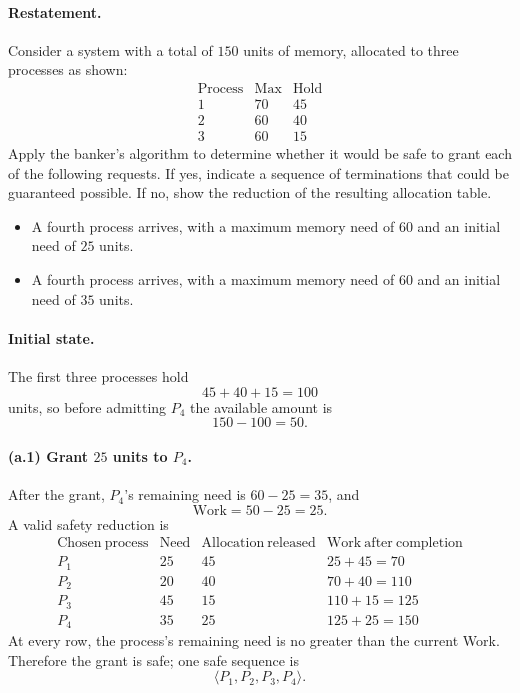 \paragraph{Restatement.}
Consider a system with a total of \(150\) units of memory, allocated to
three processes as shown:
\[
\begin{array}{c|c|c}
\mathrm{Process}&\mathrm{Max}&\mathrm{Hold}\\ \hline
1&70&45\\
2&60&40\\
3&60&15
\end{array}
\]
Apply the banker's algorithm to determine whether it would be safe to
grant each of the following requests.  If yes, indicate a sequence of
terminations that could be guaranteed possible.  If no, show the
reduction of the resulting allocation table.

\begin{itemize}
  \item[(a.1)] A fourth process arrives, with a maximum memory need of
        \(60\) and an initial need of \(25\) units.
  \item[(a.2)] A fourth process arrives, with a maximum memory need of
        \(60\) and an initial need of \(35\) units.
\end{itemize}

\paragraph{Initial state.}
The first three processes hold
\[
45+40+15=100
\]
units, so before admitting \(P_4\) the available amount is
\[
150-100=50.
\]

\paragraph{(a.1) Grant \(25\) units to \(P_4\).}
After the grant, \(P_4\)'s remaining need is \(60-25=35\), and
\[
\mathrm{Work}=50-25=25.
\]
A valid safety reduction is
\[
\begin{array}{c|c|c|c}
\mathrm{Chosen\ process}&\mathrm{Need}&
\mathrm{Allocation\ released}&\mathrm{Work\ after\ completion}\\ \hline
P_1&25&45&25+45=70\\
P_2&20&40&70+40=110\\
P_3&45&15&110+15=125\\
P_4&35&25&125+25=150
\end{array}
\]
At every row, the process's remaining need is no greater than the
current Work.  Therefore the grant is safe; one safe sequence is
\[
\boxed{\langle P_1,P_2,P_3,P_4\rangle}.
\]

